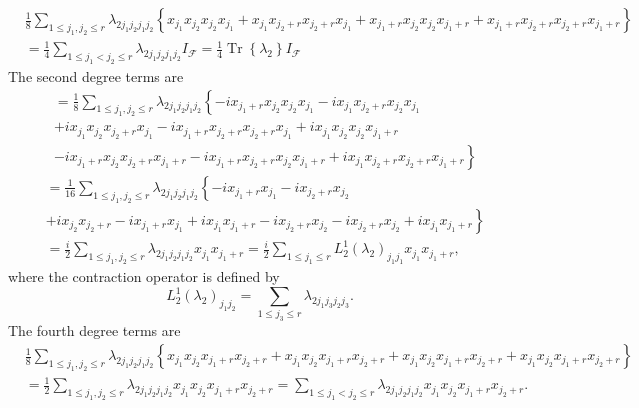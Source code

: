 \documentclass[aps, preprint]{revtex4}
\begin{document}
\begin{align} & \frac{1}{8} \sum _{1 \leq j_{1} ,j_{2} \leq r}\lambda _{2 j_{1} j_{2} j_{1} j_{2}} \left \{x_{j_{1}} x_{j_{2}} x_{j_{2}} x_{j_{1}} +x_{j_{1}} x_{j_{2} +r} x_{j_{2} +r} x_{j_{1}} +x_{j_{1} +r} x_{j_{2}} x_{j_{2}} x_{j_{1} +r} +x_{j_{1} +r} x_{j_{2} +r} x_{j_{2} +r} x_{j_{1} +r}\right \} \nonumber  \\
 &  =\frac{1}{4} \sum _{1 \leq j_{1} <j_{2} \leq r}\lambda _{2 j_{1} j_{2} j_{1} j_{2}} I_{\mathcal{F}} =\frac{1}{4} \ensuremath{\operatorname*{Tr}}\left \{\lambda _{2}\right \} I_{\mathcal{F}}\end{align}The second degree terms are
\begin{align*} &  =\frac{1}{8} \sum _{1 \leq j_{1} ,j_{2} \leq r}\lambda _{2 j_{1} j_{2} j_{1} j_{2}}\left \{ -i x_{j_{1} +r} x_{j_{2}} x_{j_{2}} x_{j_{1}} -i x_{j_{1}} x_{j_{2} +r} x_{j_{2}} x_{j_{1}}\right . \\
 &  +i x_{j_{1}} x_{j_{2}} x_{j_{2} +r} x_{j_{1}} -i x_{j_{1} +r} x_{j_{2} +r} x_{j_{2} +r} x_{j_{1}} +i x_{j_{1}} x_{j_{2}} x_{j_{2}} x_{j_{1} +r} \\
 &  -\left .i x_{j_{1} +r} x_{j_{2}} x_{j_{2} +r} x_{j_{1} +r} -i x_{j_{1} +r} x_{j_{2} +r} x_{j_{2}} x_{j_{1} +r} +i x_{j_{1}} x_{j_{2} +r} x_{j_{2} +r} x_{j_{1} +r}\right \}\end{align*}
\begin{align} &  =\frac{1}{16} \sum _{1 \leq j_{1} ,j_{2} \leq r}\lambda _{2 j_{1} j_{2} j_{1} j_{2}}\left \{ -i x_{j_{1} +r} x_{j_{1}} -i x_{j_{2} +r} x_{j_{2}}\right . \nonumber  \\
 &  +i x_{j_{2}} x_{j_{2} +r} -i x_{j_{1} +r} x_{j_{1}} +i x_{j_{1}} x_{j_{1} +r} -i x_{j_{2} +r} x_{j_{2}} -\left .i x_{j_{2} +r} x_{j_{2}} +i x_{j_{1}} x_{j_{1} +r}\right \} \nonumber  \\
 &  =\frac{i}{2} \sum _{1 \leq j_{1} ,j_{2} \leq r}\lambda _{2 j_{1} j_{2} j_{1} j_{2}} x_{j_{1}} x_{j_{1} +r} =\frac{i}{2} \sum _{1 \leq j_{1} \leq r}L_{2}^{1} \left (\lambda _{2}\right )_{j_{1} j_{1}} x_{j_{1}} x_{j_{1} +r}\text{,}\end{align}where the contraction operator is defined by
\begin{equation}L_{2}^{1} \left (\lambda _{2}\right )_{j_{1} j_{2}} =\sum _{1 \leq j_{3} \leq r}\lambda _{2 j_{1} j_{3} j_{2} j_{3}}\text{.}
\end{equation}The fourth degree terms are
\begin{align} & \frac{1}{8} \sum _{1 \leq j_{1} ,j_{2} \leq r}\lambda _{2 j_{1} j_{2} j_{1} j_{2}} \left \{x_{j_{1}} x_{j_{2}} x_{j_{1} +r} x_{j_{2} +r} +x_{j_{1}} x_{j_{2}} x_{j_{1} +r} x_{j_{2} +r} +x_{j_{1}} x_{j_{2}} x_{j_{1} +r} x_{j_{2} +r} +x_{j_{1}} x_{j_{2}} x_{j_{1} +r} x_{j_{2} +r}\right \} \nonumber  \\
 &  =\frac{1}{2} \sum _{1 \leq j_{1} ,j_{2} \leq r}\lambda _{2 j_{1} j_{2} j_{1} j_{2}} x_{j_{1}} x_{j_{2}} x_{j_{1} +r} x_{j_{2} +r} =\sum _{1 \leq j_{1} <j_{2} \leq r}\lambda _{2 j_{1} j_{2} j_{1} j_{2}} x_{j_{1}} x_{j_{2}} x_{j_{1} +r} x_{j_{2} +r}\text{.}\end{align}
\end{document}
